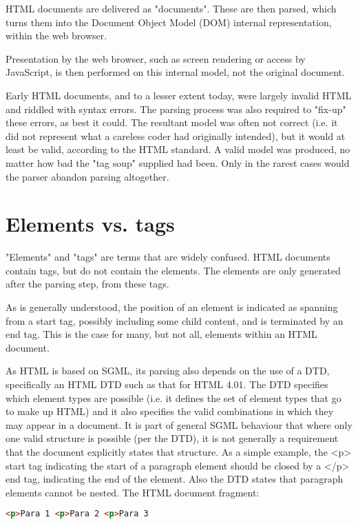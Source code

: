 HTML documents are delivered as "documents". These are then parsed, which turns them into the Document Object Model (DOM) internal representation, within the web browser.

Presentation by the web browser, such as screen rendering or access by JavaScript, is then performed on this internal model, not the original document.

Early HTML documents, and to a lesser extent today, were largely invalid HTML and riddled with syntax errors. The parsing process was also required to "fix-up" these errors, as best it could. The resultant model was often not correct (i.e. it did not represent what a careless coder had originally intended), but it would at least be valid, according to the HTML standard. A valid model was produced, no matter how bad the "tag soup" supplied had been. Only in the rarest cases would the parser abandon parsing altogether.


\section{Elements vs. tags}

"Elements" and "tags" are terms that are widely confused. HTML documents contain tags, but do not contain the elements. The elements are only generated after the parsing step, from these tags.

As is generally understood, the position of an element is indicated as spanning from a start tag, possibly including some child content, and is terminated by an end tag. This is the case for many, but not all, elements within an HTML document.

As HTML is based on SGML, its parsing also depends on the use of a DTD, specifically an HTML DTD such as that for HTML 4.01. The DTD specifies which element types are possible (i.e. it defines the set of element types that go to make up HTML) and it also specifies the valid combinations in which they may appear in a document. It is part of general SGML behaviour that where only one valid structure is possible (per the DTD), it is not generally a requirement that the document explicitly states that structure. As a simple example, the <p> start tag indicating the start of a paragraph element should be closed by a </p> end tag, indicating the end of the element. Also the DTD states that paragraph elements cannot be nested. The HTML document fragment:


\begin{lstlisting}[language=HTML]
<p>Para 1 <p>Para 2 <p>Para 3
\end{lstlisting}

